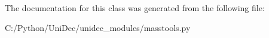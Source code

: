 The documentation for this class was generated from the following file\+:\begin{DoxyCompactItemize}
\item 
C\+:/\+Python/\+Uni\+Dec/unidec\+\_\+modules/masstools.\+py\end{DoxyCompactItemize}
